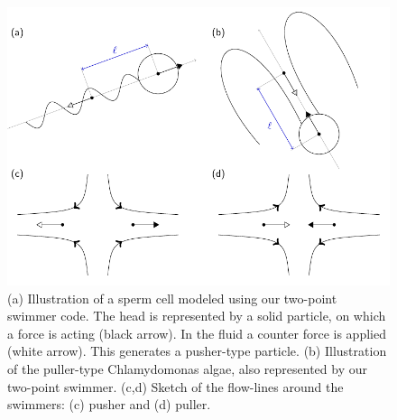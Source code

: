 \documentclass[aip,jcp,reprint,a4paper,onecolumn,amsmath]{revtex4-1}
\begin{document}
\begin{figure}[!htb]
\begin{center}
\includegraphics[scale=1.0]{FIGURES/pusher-puller}
\end{center}
\caption{\label{fig:pusher-puller}(a) Illustration of a sperm cell modeled using our two-point swimmer code. The head is represented by a solid particle, on which a force is acting (black arrow). In the fluid a counter force is applied (white arrow). This generates a pusher-type particle. (b) Illustration of the puller-type Chlamydomonas algae, also represented by our two-point swimmer. (c,d) Sketch of the flow-lines around the swimmers: (c) pusher and (d) puller.}
\end{figure}
\end{document}
